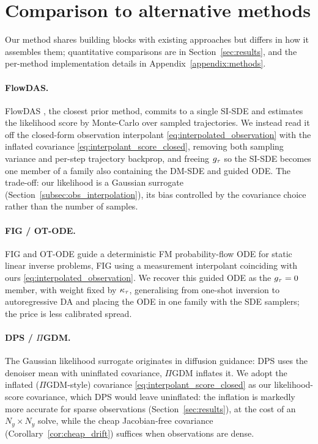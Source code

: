 \section{Comparison to alternative methods}\label{appendix:comparison}

Our method shares building blocks with existing approaches but differs in how it assembles them; quantitative comparisons are in Section~\ref{sec:results}, and the per-method implementation details in Appendix~\ref{appendix:methods}.

\paragraph{FlowDAS.}
FlowDAS \cite{chen_flowdas_2025}, the closest prior method, commits to a single SI-SDE and estimates the likelihood score by Monte-Carlo over sampled trajectories. We instead read it off the closed-form observation interpolant \eqref{eq:interpolated_observation} with the inflated covariance \eqref{eq:interpolant_score_closed}, removing both sampling variance and per-step trajectory backprop, and freeing $g_\tau$ so the SI-SDE becomes one member of a family also containing the DM-SDE and guided ODE. The trade-off: our likelihood is a Gaussian surrogate (Section~\ref{subsec:obs_interpolation}), its bias controlled by the covariance choice rather than the number of samples.

\paragraph{FIG / OT-ODE.}
FIG \cite{yan_fig_2024} and OT-ODE \cite{pokle_training-free_2024} guide a deterministic FM probability-flow ODE for static linear inverse problems, FIG using a measurement interpolant coinciding with ours \eqref{eq:interpolated_observation}. We recover this guided ODE as the $g_\tau=0$ member, with weight fixed by $\kappa_\tau$, generalising from one-shot inversion to autoregressive DA and placing the ODE in one family with the SDE samplers; the price is less calibrated spread.

\paragraph{DPS / $\Pi$GDM.}
The Gaussian likelihood surrogate originates in diffusion guidance: DPS \cite{chung_diffusion_2023} uses the denoiser mean with uninflated covariance, $\Pi$GDM \cite{song_pseudoinverse_2023} inflates it. We adopt the inflated ($\Pi$GDM-style) covariance \eqref{eq:interpolant_score_closed} as our likelihood-score covariance, which DPS would leave uninflated: the inflation is markedly more accurate for sparse observations (Section~\ref{sec:results}), at the cost of an $N_y\times N_y$ solve, while the cheap Jacobian-free covariance (Corollary~\ref{cor:cheap_drift}) suffices when observations are dense.

